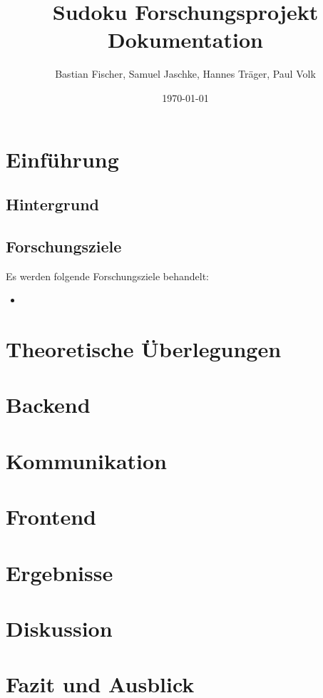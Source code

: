 \documentclass[12pt,a4paper]{article}
\title{Sudoku Forschungsprojekt Dokumentation}
\author{Bastian Fischer, Samuel Jaschke, Hannes Träger, Paul Volk}
\date{\today}
\begin{document}
\maketitle

\begin{abstract}
\end{abstract}

\section{Einführung}
\subsection{Hintergrund}

\subsection{Forschungsziele}
Es werden folgende Forschungsziele behandelt:
\begin{itemize}
    \item  
\end{itemize}

\section{Theoretische Überlegungen}



\section{Backend}


\section{Kommunikation}


\section{Frontend}


\section{Ergebnisse}

\section{Diskussion}

\section{Fazit und Ausblick}





\end{document}
